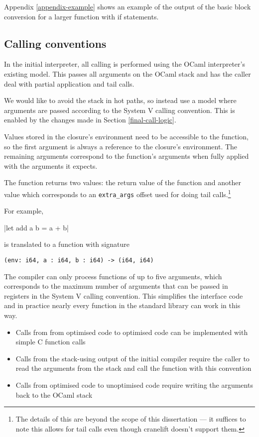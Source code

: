 Appendix \ref{appendix-example} shows an example of the output of the basic block conversion for a
larger function with if statements.

\subsection{Calling conventions} \label{calling-conventions}

In the initial interpreter, all calling is performed using the OCaml interpreter's existing model.
This
passes all arguments on the OCaml stack and has the caller deal with partial application and tail
calls.

We would like to avoid the stack in hot paths, so instead use a model where arguments are passed
according to the
System V calling convention. This is enabled by the changes made in Section \ref{final-call-logic}.

Values stored in the closure's environment need to be accessible to the function, so the first
argument is always a reference to the closure's environment. The remaining arguments correspond to
the function's arguments when fully applied with the arguments it expects.

The function returns two values: the return value of the function and another value which
corresponds to an \texttt{extra\_args} offset used for doing tail calls.\footnote{
      The details of this are beyond the scope of this dissertation --- it suffices to note this
      allows for tail calls even though cranelift doesn't support them.}

For example,

|let add a b = a + b|

is translated to a function with signature

\begin{verbatim}
(env: i64, a : i64, b : i64) -> (i64, i64)
\end{verbatim}

The compiler can only process functions of up to five arguments, which corresponds to the maximum
number of arguments that can be passed in registers in the System V calling convention. This
simplifies the interface code and in practice nearly every function in the standard library can
work in this way.

\begin{itemize}
      \item Calls from from optimised code to optimised code can be implemented with simple C
            function calls
      \item Calls from the stack-using output of the initial compiler require the caller to read
            the arguments
            from the stack and call the function with this convention
      \item Calls from optimised code to unoptimised
            code require writing the arguments back to the OCaml stack
\end{itemize}

